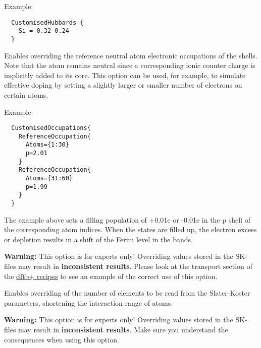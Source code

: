 \begin{description}
  Example:
  \begin{verbatim}
  CustomisedHubbards {
    Si = 0.32 0.24
  }
  \end{verbatim}

\item[\kw{CustomisedOccupations} / \is{CustomizedOccupations}] Enables
  overriding the reference neutral atom electronic occupations of the
  shells. Note that the atom remains neutral since a corresponding ionic counter
  charge is implicitly added to its core. This option can be used, for example,
  to simulate effective doping by setting a slightly larger or smaller number of
  electrons on certain atoms.

  Example:
  \begin{verbatim}
  CustomisedOccupations{
    ReferenceOccupation{
      Atoms={1:30}
      p=2.01
    }
    ReferenceOccupation{
      Atoms={31:60}
      p=1.99
    }
  }
  \end{verbatim}

  The example above sets a filling population of +0.01e or -0.01e in the p shell
  of the corresponding atom indices. When the states are filled up, the electron
  excess or depletion results in a shift of the Fermi level in the bands.

  \textbf{Warning:} This option is for experts only! Overriding values stored in
  the SK-files may result in \textbf{inconsistent results}. Please look at the
  transport section of the
  \href{https://dftbplus-recipes.readthedocs.io/en/latest/}{dftb+ recipes} to
  see an example of the correct use of this option.

\item[\is{TruncateSKRange}] Enables overriding of the number of elements to be
  read from the Slater-Koster parameters, shortening the interaction range of
  atoms.

  \textbf{Warning:} This option is for experts only! Overriding values stored in
  the SK-files may result in \textbf{inconsistent results}. Make sure you
  understand the consequences when using this option.


\end{description}
